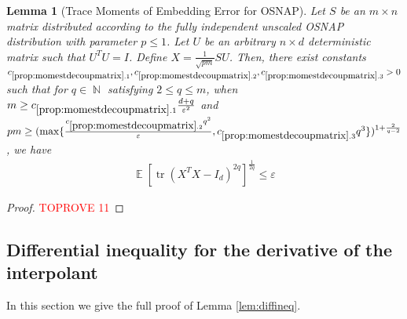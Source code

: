 \documentclass[11pt]{amsart}
\numberwithin{equation}{section}
\numberwithin{equation}{section}
\DeclareMathOperator{\E}{\mathbb{E}}
\DeclareMathOperator{\N}{\mathbb{N}}
\DeclareMathOperator*{\tr}{tr}
\newtheorem{lemma}[theorem]{Lemma}
\theoremstyle{remark}
\theoremstyle{definition}
\begin{document}
\begin{lemma}[Trace Moments of Embedding Error for OSNAP] \label{prop:momestdecoupmatrix}
Let $S$ be an $m \times n$ matrix distributed according to the fully independent unscaled OSNAP distribution with parameter $p \le 1$. Let $U$ be an arbitrary $n \times d$ deterministic matrix such that $U^TU=I$. Define $X = \frac{1}{\sqrt{pm}}SU$.  Then, there exist constants $c_{\ref*{prop:momestdecoupmatrix}.1}, c_{\ref*{prop:momestdecoupmatrix}.2}, c_{\ref*{prop:momestdecoupmatrix}.3} > 0$ such that for $q \in \N$ satisfying $2 \le q \le m$, when $m \geq c_{\ref*{prop:momestdecoupmatrix}.1} \frac{d+q}{\varepsilon^2}$ and $ pm \ge (\max\{\frac{c_{\ref*{prop:momestdecoupmatrix}.2} q^{2}}{\varepsilon}, c_{\ref*{prop:momestdecoupmatrix}.3} q^3\})^{1+\frac{2}{q-2}} $, we have
\begin{align*}
    \E[\tr(X^TX - I_d)^{2q}]^\frac{1}{2q} \leq  \varepsilon
\end{align*} 

\end{lemma}

\begin{proof}\textcolor{red}{TOPROVE 11}\end{proof}

\subsection{Differential inequality for the derivative of the interpolant}\label{subsec:diffineq}
In this section we give the full proof of Lemma \ref{lem:diffineq}.
\end{document}
